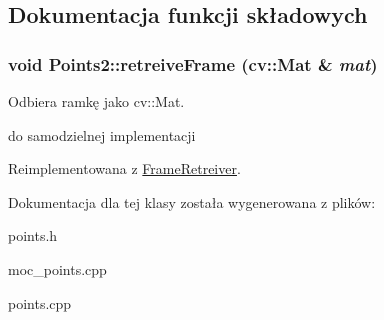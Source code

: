 \subsection{Dokumentacja funkcji składowych}
\hypertarget{class_points2_af46dd0cd21f73b3214d5f766349b8450}{
\subsubsection[{retreiveFrame}]{\setlength{\rightskip}{0pt plus 5cm}void Points2::retreiveFrame (cv::Mat \& {\em mat})}}
\label{class_points2_af46dd0cd21f73b3214d5f766349b8450}


Odbiera ramkę jako cv::Mat. 

do samodzielnej implementacji 

Reimplementowana z \hyperlink{class_frame_retreiver_a72912583af45c00d267f215a0d0b9bb1}{FrameRetreiver}.



Dokumentacja dla tej klasy została wygenerowana z plików:\begin{DoxyCompactItemize}
\item 
points.h\item 
moc\_\-points.cpp\item 
points.cpp\end{DoxyCompactItemize}
